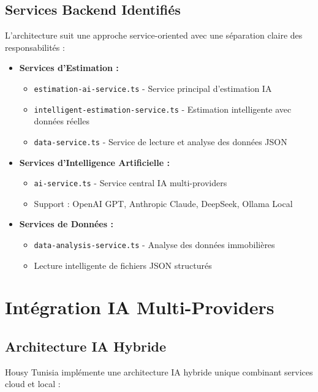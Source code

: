 \subsection{Services Backend Identifiés}

L'architecture suit une approche service-oriented avec une séparation claire des responsabilités :

\begin{itemize}
    \item \textbf{Services d'Estimation :}
    \begin{itemize}
        \item \texttt{estimation-ai-service.ts} - Service principal d'estimation IA
        \item \texttt{intelligent-estimation-service.ts} - Estimation intelligente avec données réelles
        \item \texttt{data-service.ts} - Service de lecture et analyse des données JSON
    \end{itemize}
    
    \item \textbf{Services d'Intelligence Artificielle :}
    \begin{itemize}
        \item \texttt{ai-service.ts} - Service central IA multi-providers
        \item Support : OpenAI GPT, Anthropic Claude, DeepSeek, Ollama Local
    \end{itemize}
    
    \item \textbf{Services de Données :}
    \begin{itemize}
        \item \texttt{data-analysis-service.ts} - Analyse des données immobilières
        \item Lecture intelligente de fichiers JSON structurés
    \end{itemize}
\end{itemize}

\section{Intégration IA Multi-Providers}

\subsection{Architecture IA Hybride}

Housy Tunisia implémente une architecture IA hybride unique combinant services cloud et local :

